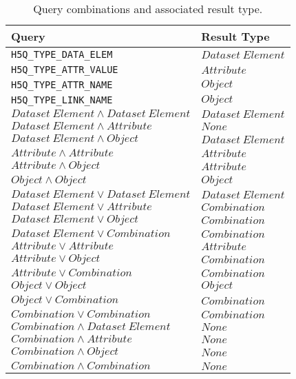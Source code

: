 \documentclass[letterpaper,hyper]{THG_RFC}
\begin{document}
\begin{table}[ht]\footnotesize
\caption{Query combinations and associated result type.}
\label{tab:querycomb}
\begin{tabular}{ll} \toprule
Query &
Result Type\\ \midrule
\texttt{H5Q\_TYPE\_DATA\_ELEM} & $Dataset~Element$ \\
\texttt{H5Q\_TYPE\_ATTR\_VALUE} & $Attribute$ \\
\texttt{H5Q\_TYPE\_ATTR\_NAME} & $Object$ \\
\texttt{H5Q\_TYPE\_LINK\_NAME} & $Object$ \\
$Dataset~Element \land Dataset~Element$ & $Dataset~Element$ \\
$Dataset~Element \land Attribute$ & $None$ \\
$Dataset~Element \land Object$ & $Dataset~Element$ \\
$Attribute \land Attribute$ & $Attribute$ \\
$Attribute \land Object$ & $Attribute$ \\
$Object \land Object$ & $Object$ \\
$Dataset~Element \lor Dataset~Element$ & $Dataset~Element$ \\
$Dataset~Element \lor Attribute$ & $Combination$ \\
$Dataset~Element \lor Object$ & $Combination$ \\
$Dataset~Element \lor Combination$ & $Combination$ \\
$Attribute \lor Attribute$ & $Attribute$ \\
$Attribute \lor Object$ & $Combination$ \\
$Attribute \lor Combination$ & $Combination$ \\
$Object \lor Object$ & $Object$ \\
$Object \lor Combination$ & $Combination$ \\
$Combination \lor Combination$ & $Combination$ \\
$Combination \land Dataset~Element$ & $None$ \\
$Combination \land Attribute$ & $None$ \\
$Combination \land Object$ & $None$ \\
$Combination \land Combination$ & $None$ \\
\bottomrule
\end{tabular}
\end{table}
\end{document}
